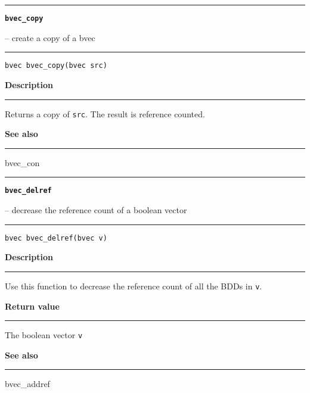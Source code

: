 \begin{minipage}{\textwidth}

\noindent\begin{minipage}{\textwidth}
\rule{\textwidth}{0.5mm}
{\tt\bf bvec\_copy }
\--- create a copy of a bvec  \hspace{\fill}
\\\rule[1.5ex]{\textwidth}{0.5mm}
\end{minipage}

\noindent\begin{verbatim}
bvec bvec_copy(bvec src) 
\end{verbatim}

\vspace{\parsep}\noindent
{\bf Description}\\\rule[1.5ex]{\textwidth}{0.2mm}\vspace{-1.5ex}\setlength{\parindent}{1em}
Returns a copy of {\tt src}. The result is reference counted. 

\vspace{\parsep}\vspace{\baselineskip}\noindent
{\bf See also}\\\rule[1.5ex]{\textwidth}{0.2mm}\vspace{-1.5ex}
bvec\_con 
\end{minipage}
\vspace{8ex}
\begin{minipage}{\textwidth}

\noindent\begin{minipage}{\textwidth}
\rule{\textwidth}{0.5mm}
{\tt\bf bvec\_delref }
\--- decrease the reference count of a boolean vector  \hspace{\fill}
\\\rule[1.5ex]{\textwidth}{0.5mm}
\end{minipage}

\noindent\begin{verbatim}
bvec bvec_delref(bvec v) 
\end{verbatim}

\vspace{\parsep}\noindent
{\bf Description}\\\rule[1.5ex]{\textwidth}{0.2mm}\vspace{-1.5ex}\setlength{\parindent}{1em}
Use this function to decrease the reference count of all the
           BDDs in {\tt v}. 

\setlength{\parindent}{0em}\vspace{\parsep}\vspace{\baselineskip}\noindent
{\bf Return value}\\\rule[1.5ex]{\textwidth}{0.2mm}\vspace{-1.5ex}
The boolean vector {\tt v} 

\vspace{\parsep}\vspace{\baselineskip}\noindent
{\bf See also}\\\rule[1.5ex]{\textwidth}{0.2mm}\vspace{-1.5ex}
bvec\_addref 
\end{minipage}
